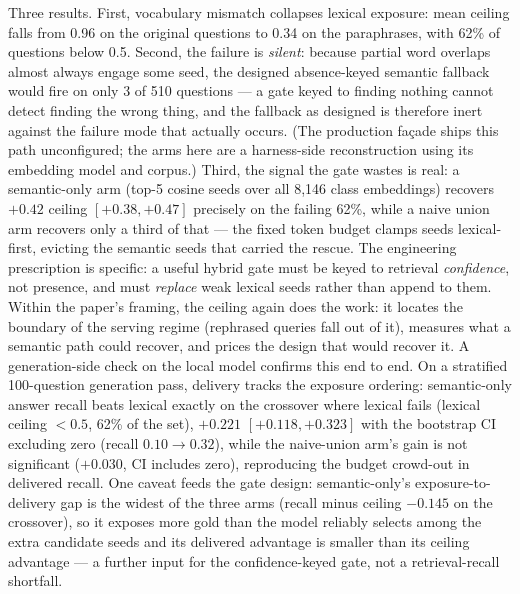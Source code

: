 \documentclass[10pt,twocolumn]{article}
\begin{document}
Three results. First, vocabulary mismatch collapses lexical exposure: mean ceiling falls from
0.96 on the original questions to 0.34 on the paraphrases, with 62\% of questions below 0.5.
Second, the failure is \emph{silent}: because partial word overlaps almost always engage some
seed, the designed absence-keyed semantic fallback would fire on only 3 of 510 questions ---
a gate keyed to finding nothing cannot detect finding the wrong thing, and the fallback as
designed is therefore inert against the failure mode that actually occurs. (The production
fa\c{c}ade ships this path unconfigured; the arms here are a harness-side reconstruction using
its embedding model and corpus.) Third, the signal the gate wastes is real: a semantic-only arm
(top-5 cosine seeds over all 8{,}146 class embeddings) recovers $+0.42$ ceiling
$[+0.38,+0.47]$ precisely on the failing 62\%, while a naive union arm recovers only a third of
that --- the fixed token budget clamps seeds lexical-first, evicting the semantic seeds that
carried the rescue. The engineering prescription is specific: a useful hybrid gate must be keyed
to retrieval \emph{confidence}, not presence, and must \emph{replace} weak lexical seeds rather
than append to them. Within the paper's framing, the ceiling again does the work: it locates
the boundary of the serving regime (rephrased queries fall out of it), measures what a semantic
path could recover, and prices the design that would recover it. A generation-side check on the local
model confirms this end to end. On a stratified 100-question generation pass, delivery tracks the
exposure ordering: semantic-only answer recall beats lexical exactly on the crossover where lexical
fails (lexical ceiling $<0.5$, 62\% of the set), $+0.221$ $[+0.118,+0.323]$ with the bootstrap CI
excluding zero (recall $0.10\to0.32$), while the naive-union arm's gain is not significant
($+0.030$, CI includes zero), reproducing the budget crowd-out in delivered recall. One caveat
feeds the gate design: semantic-only's exposure-to-delivery gap is the widest of the three arms
(recall minus ceiling $-0.145$ on the crossover), so it exposes more gold than the model reliably
selects among the extra candidate seeds and its delivered advantage is smaller than its ceiling
advantage --- a further input for the confidence-keyed gate, not a retrieval-recall shortfall.
\end{document}
